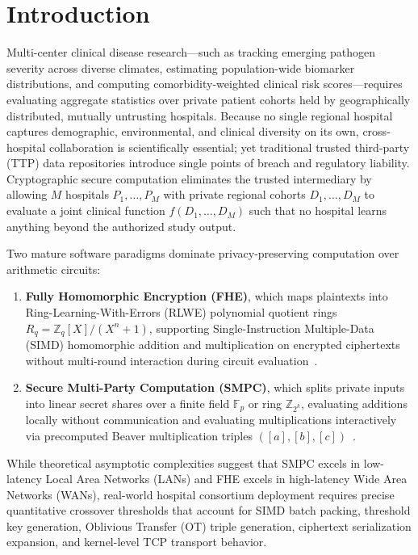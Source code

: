 \documentclass[conference]{IEEEtran}
\begin{document}
\section{Introduction}
Multi-center clinical disease research---such as tracking emerging pathogen severity across diverse climates, estimating population-wide biomarker distributions, and computing comorbidity-weighted clinical risk scores---requires evaluating aggregate statistics over private patient cohorts held by geographically distributed, mutually untrusting hospitals. Because no single regional hospital captures demographic, environmental, and clinical diversity on its own, cross-hospital collaboration is scientifically essential; yet traditional trusted third-party (TTP) data repositories introduce single points of breach and regulatory liability. Cryptographic secure computation eliminates the trusted intermediary by allowing $M$ hospitals $P_1, \dots, P_M$ with private regional cohorts $D_1, \dots, D_M$ to evaluate a joint clinical function $f(D_1, \dots, D_M)$ such that no hospital learns anything beyond the authorized study output.

Two mature software paradigms dominate privacy-preserving computation over arithmetic circuits:
\begin{enumerate}
    \item \textbf{Fully Homomorphic Encryption (FHE)}, which maps plaintexts into Ring-Learning-With-Errors (RLWE) polynomial quotient rings $R_q = \mathbb{Z}_q[X]/(X^n+1)$, supporting Single-Instruction Multiple-Data (SIMD) homomorphic addition and multiplication on encrypted ciphertexts without multi-round interaction during circuit evaluation~\cite{gentry2009,bfv2012,openfhe2022}.
    \item \textbf{Secure Multi-Party Computation (SMPC)}, which splits private inputs into linear secret shares over a finite field $\mathbb{F}_p$ or ring $\mathbb{Z}_{2^k}$, evaluating additions locally without communication and evaluating multiplications interactively via precomputed Beaver multiplication triples $([a], [b], [c])$~\cite{shamir1979,beaver1991,mpspdz2020}.
\end{enumerate}

While theoretical asymptotic complexities suggest that SMPC excels in low-latency Local Area Networks (LANs) and FHE excels in high-latency Wide Area Networks (WANs), real-world hospital consortium deployment requires precise quantitative crossover thresholds that account for SIMD batch packing, threshold key generation, Oblivious Transfer (OT) triple generation, ciphertext serialization expansion, and kernel-level TCP transport behavior.
\end{document}

